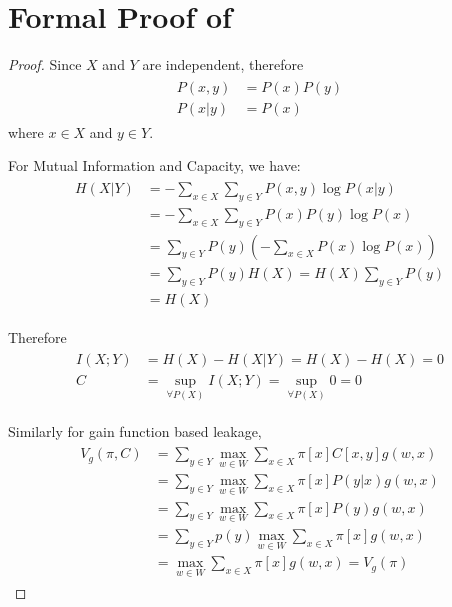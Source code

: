 \chapter{Formal Proof of } \label{Prf: IR}
\begin{proof}
	Since $X$ and $Y$ are independent, therefore
	\begin{eqnarray*}
		\begin{aligned}
			P(x,y) &= P(x)P(y) \\
			P(x|y) &= P(x)
		\end{aligned}
	\end{eqnarray*}
	where $x \in X$ and $y \in Y$.

	For Mutual Information and Capacity, we have:
	\begin{eqnarray*}
		\begin{aligned}
			H(X|Y) 
			&= - \sum_{x \in X} \sum_{y \in Y} P(x,y)\log{P(x|y)} \\
			&= - \sum_{x \in X} \sum_{y \in Y} P(x)P(y)\log{P(x)} \\
			&= \sum_{y \in Y} P(y) (- \sum_{x \in X}P(x)\log{P(x)}) \\
			&= \sum_{y \in Y} P(y) H(X) = H(X) \sum_{y \in Y}{P(y)} \\
			&= H(X)
		\end{aligned}
	\end{eqnarray*}
	
	Therefore
	\begin{eqnarray*}
		\begin{aligned}
			I(X;Y) &= H(X) - H(X|Y) = H(X) - H(X) = 0 \\
			C &= \sup_{\forall P(X)} I(X;Y) = \sup_{\forall P(X)} 0 = 0
		\end{aligned}
	\end{eqnarray*}
	
	Similarly for gain function based leakage\cite{GLeakage},
	\begin{eqnarray*}
		\begin{aligned}
			V_{g}(\pi, C) 
			&= \sum_{y \in Y}{\max_{w \in W}\sum_{x \in X}{\pi[x]C[x,y]g(w,x)}} \\
			&= \sum_{y \in Y}{\max_{w \in W}\sum_{x \in X}{\pi[x]P(y|x)g(w,x)}} \\
			&= \sum_{y \in Y}{\max_{w \in W}\sum_{x \in X}{\pi[x]P(y)g(w,x)}} \\
			&= \sum_{y \in Y}p(y){\max_{w \in W}\sum_{x \in X}{\pi[x]g(w,x)}} \\
			&= \max_{w \in W}\sum_{x \in X}{\pi[x]g(w,x)} = V_{g}(\pi)
		\end{aligned}
	\end{eqnarray*}
	

\end{proof}
